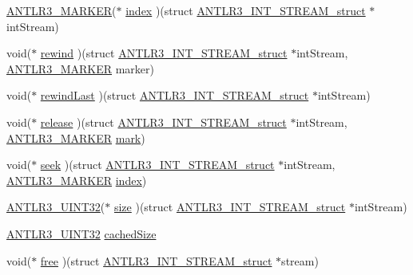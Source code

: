 \begin{DoxyCompactItemize}
\item 
\hyperlink{antlr3defs_8h_a0361e6bf442e07afe923e4d05e9ebc4f}{A\-N\-T\-L\-R3\-\_\-\-M\-A\-R\-K\-E\-R}($\ast$ \hyperlink{struct_a_n_t_l_r3___i_n_t___s_t_r_e_a_m__struct_a5141407fe8b50ff4e87f617811fd54fc}{index} )(struct \hyperlink{struct_a_n_t_l_r3___i_n_t___s_t_r_e_a_m__struct}{A\-N\-T\-L\-R3\-\_\-\-I\-N\-T\-\_\-\-S\-T\-R\-E\-A\-M\-\_\-struct} $\ast$int\-Stream)
\item 
void($\ast$ \hyperlink{struct_a_n_t_l_r3___i_n_t___s_t_r_e_a_m__struct_a8fa6f22f95f34f15d7d085fa4bddfcf8}{rewind} )(struct \hyperlink{struct_a_n_t_l_r3___i_n_t___s_t_r_e_a_m__struct}{A\-N\-T\-L\-R3\-\_\-\-I\-N\-T\-\_\-\-S\-T\-R\-E\-A\-M\-\_\-struct} $\ast$int\-Stream, \hyperlink{antlr3defs_8h_a0361e6bf442e07afe923e4d05e9ebc4f}{A\-N\-T\-L\-R3\-\_\-\-M\-A\-R\-K\-E\-R} marker)
\item 
void($\ast$ \hyperlink{struct_a_n_t_l_r3___i_n_t___s_t_r_e_a_m__struct_a5bd359e0dbc0dd65c226d573776f33b6}{rewind\-Last} )(struct \hyperlink{struct_a_n_t_l_r3___i_n_t___s_t_r_e_a_m__struct}{A\-N\-T\-L\-R3\-\_\-\-I\-N\-T\-\_\-\-S\-T\-R\-E\-A\-M\-\_\-struct} $\ast$int\-Stream)
\item 
void($\ast$ \hyperlink{struct_a_n_t_l_r3___i_n_t___s_t_r_e_a_m__struct_aaf72411c29dcfa48673babf667797ba6}{release} )(struct \hyperlink{struct_a_n_t_l_r3___i_n_t___s_t_r_e_a_m__struct}{A\-N\-T\-L\-R3\-\_\-\-I\-N\-T\-\_\-\-S\-T\-R\-E\-A\-M\-\_\-struct} $\ast$int\-Stream, \hyperlink{antlr3defs_8h_a0361e6bf442e07afe923e4d05e9ebc4f}{A\-N\-T\-L\-R3\-\_\-\-M\-A\-R\-K\-E\-R} \hyperlink{struct_a_n_t_l_r3___i_n_t___s_t_r_e_a_m__struct_ad59b7290943c5152aa28377343335983}{mark})
\item 
void($\ast$ \hyperlink{struct_a_n_t_l_r3___i_n_t___s_t_r_e_a_m__struct_a052f31580e00cb4200a6234dfcca600b}{seek} )(struct \hyperlink{struct_a_n_t_l_r3___i_n_t___s_t_r_e_a_m__struct}{A\-N\-T\-L\-R3\-\_\-\-I\-N\-T\-\_\-\-S\-T\-R\-E\-A\-M\-\_\-struct} $\ast$int\-Stream, \hyperlink{antlr3defs_8h_a0361e6bf442e07afe923e4d05e9ebc4f}{A\-N\-T\-L\-R3\-\_\-\-M\-A\-R\-K\-E\-R} \hyperlink{struct_a_n_t_l_r3___i_n_t___s_t_r_e_a_m__struct_a5141407fe8b50ff4e87f617811fd54fc}{index})
\item 
\hyperlink{antlr3defs_8h_ac41f744abd0fd25144b9eb9d11b1dfd1}{A\-N\-T\-L\-R3\-\_\-\-U\-I\-N\-T32}($\ast$ \hyperlink{struct_a_n_t_l_r3___i_n_t___s_t_r_e_a_m__struct_a0b98371dec207f65b25d8d65e05ebac3}{size} )(struct \hyperlink{struct_a_n_t_l_r3___i_n_t___s_t_r_e_a_m__struct}{A\-N\-T\-L\-R3\-\_\-\-I\-N\-T\-\_\-\-S\-T\-R\-E\-A\-M\-\_\-struct} $\ast$int\-Stream)
\item 
\hyperlink{antlr3defs_8h_ac41f744abd0fd25144b9eb9d11b1dfd1}{A\-N\-T\-L\-R3\-\_\-\-U\-I\-N\-T32} \hyperlink{struct_a_n_t_l_r3___i_n_t___s_t_r_e_a_m__struct_a4d0db22c90c1cff328305c2369c28c1a}{cached\-Size}
\item 
void($\ast$ \hyperlink{struct_a_n_t_l_r3___i_n_t___s_t_r_e_a_m__struct_ae4fa4d24c35c6d5975aef2fd0bca71a0}{free} )(struct \hyperlink{struct_a_n_t_l_r3___i_n_t___s_t_r_e_a_m__struct}{A\-N\-T\-L\-R3\-\_\-\-I\-N\-T\-\_\-\-S\-T\-R\-E\-A\-M\-\_\-struct} $\ast$stream)
\end{DoxyCompactItemize}


